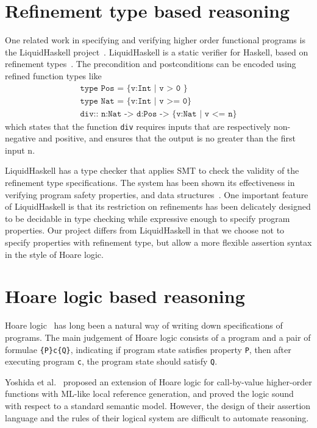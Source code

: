 \section{Refinement type based reasoning} One related work in specifying and verifying higher order functional programs is the LiquidHaskell project~\cite{Rondon2008LiquidTypes}. LiquidHaskell is a static verifier for Haskell, based on refinement types~\cite{Vazou2014LiquidHaskell}. The precondition and postconditions can be encoded using refined function types like 
$$
\begin{array}{l}
\texttt{type Pos = \{v:Int | v > 0 \} } \\
\texttt{type Nat = \{v:Int | v >= 0\} } \\
\texttt{div:: n:Nat -> d:Pos -> \{v:Nat | v <= n\}}
\end{array}
$$ 
which states that the function \texttt{div} requires inputs that are respectively non-negative and positive, and ensures that the output is no greater than the first input n. 

LiquidHaskell has a type checker that applies SMT to check the validity of the refinement type specifications. The system has been shown its effectiveness in verifying program safety properties, and data structures~\cite{Kawaguchi2009LHDS}. One important feature of LiquidHaskell is that its restriction on refinements has been delicately designed to be decidable in type checking while expressive enough to specify program properties. Our project differs from LiquidHaskell in that we choose not to specify properties with refinement type, but allow a more flexible assertion syntax in the style of Hoare logic.


\section{Hoare logic based reasoning} Hoare logic~\cite{Hoare1969} has long been a natural way of writing down specifications of programs. The main judgement of Hoare logic consists of a program and a pair of formulae \texttt{\{P\}c\{Q\}}, indicating if program state satisfies property \texttt{P}, then after executing program \texttt{c}, the program state should satisfy \texttt{Q}. 

Yoshida et al.~\cite{Yoshida2008} proposed an extension of Hoare logic for call-by-value higher-order functions with ML-like local reference generation, and proved the logic sound with respect to a standard semantic model. However, the design of their assertion language and the rules of their logical system are difficult to automate reasoning.